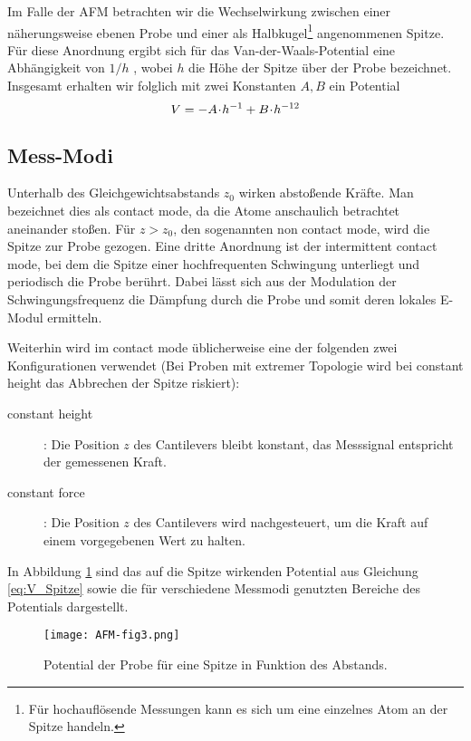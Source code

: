 Im Falle der AFM betrachten wir die Wechselwirkung zwischen einer näherungsweise ebenen Probe und einer als Halbkugel\footnote{Für hochauflösende Messungen kann es sich um eine einzelnes Atom an der Spitze handeln.} angenommenen Spitze. Für diese Anordnung ergibt sich für das Van-der-Waals-Potential eine Abhängigkeit von $1/h$ \cite[S. 5]{lit:hampp}, wobei $h$ die Höhe der Spitze über der Probe bezeichnet. Insgesamt erhalten wir folglich mit zwei Konstanten $A, B$ ein Potential
\begin{equation}
  V =  - A \!\cdot\! h^{-1} + B \!\cdot\! h^{-12} \label{eq:V_Spitze}
\end{equation}

\subsection{Mess-Modi}
Unterhalb des Gleichgewichtsabstands $z_0$ wirken abstoßende Kräfte. Man bezeichnet dies als contact mode, da die Atome anschaulich betrachtet aneinander stoßen. Für $z > z_0$, den sogenannten non contact mode, wird die Spitze zur Probe gezogen. Eine dritte Anordnung ist der intermittent contact mode, bei dem die Spitze einer hochfrequenten Schwingung unterliegt und periodisch die Probe berührt. Dabei lässt sich aus der Modulation der Schwingungsfrequenz die Dämpfung durch die Probe und somit deren lokales E-Modul ermitteln.

Weiterhin wird im contact mode üblicherweise eine der folgenden zwei Konfigurationen verwendet (Bei Proben mit extremer Topologie wird bei constant height das Abbrechen der Spitze riskiert):
\begin{description}
 \item[constant height]: Die Position $z$ des Cantilevers bleibt konstant, das Messsignal entspricht der gemessenen Kraft.
 \item[constant force]: Die Position $z$ des Cantilevers wird nachgesteuert, um die Kraft auf einem vorgegebenen Wert zu halten.
\end{description}

In Abbildung \ref{fig:Potential} sind das auf die Spitze wirkenden Potential aus Gleichung \eqref{eq:V_Spitze} sowie die für verschiedene Messmodi genutzten Bereiche des Potentials dargestellt.

\begin{figure}[h]
	\centering
	\texttt{[image: AFM-fig3.png]}
	\caption{Potential der Probe für eine Spitze in Funktion des Abstands.}
	\label{fig:Potential}
\end{figure}

